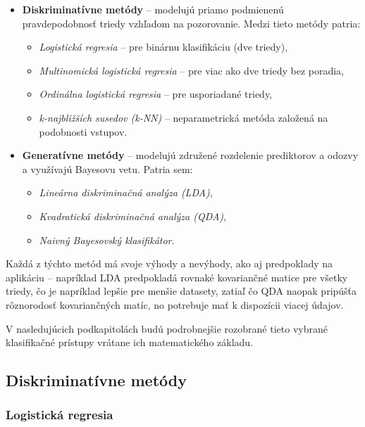 \begin{itemize}
  \item \textbf{Diskriminatívne metódy} – modelujú priamo podmienenú pravdepodobnosť triedy vzhľadom na pozorovanie. Medzi tieto metódy patria:
  \begin{itemize}
    \item \textit{Logistická regresia} – pre binárnu klasifikáciu (dve triedy),
    \item \textit{Multinomická logistická regresia} – pre viac ako dve triedy bez poradia,
    \item \textit{Ordinálna logistická regresia} – pre usporiadané triedy,
    \item \textit{k-najbližších susedov (k-NN)} – neparametrická metóda založená na podobnosti vstupov.
  \end{itemize}
  
  \item \textbf{Generatívne metódy} – modelujú združené rozdelenie prediktorov a odozvy a využívajú Bayesovu vetu. Patria sem:
  \begin{itemize}
    \item \textit{Lineárna diskriminačná analýza (LDA)},
    \item \textit{Kvadratická diskriminačná analýza (QDA)},
    \item \textit{Naivný Bayesovský klasifikátor}.
  \end{itemize}
\end{itemize}

Každá z týchto metód má svoje výhody a nevýhody, ako aj predpoklady na aplikáciu – napríklad LDA predpokladá rovnaké kovariančné matice pre všetky triedy, čo je napríklad lepšie pre menšie datasety, zatiaľ čo QDA naopak pripúšťa rôznorodosť kovariančných matíc, no potrebuje mať k dispozícii viacej údajov.

V nasledujúcich podkapitolách budú podrobnejšie rozobrané tieto vybrané klasifikačné prístupy vrátane ich matematického základu.

\subsection{Diskriminatívne metódy}
\label{subsec:disc_methods}

\subsubsection{Logistická regresia}
\label{subsubsec:log_regression}

